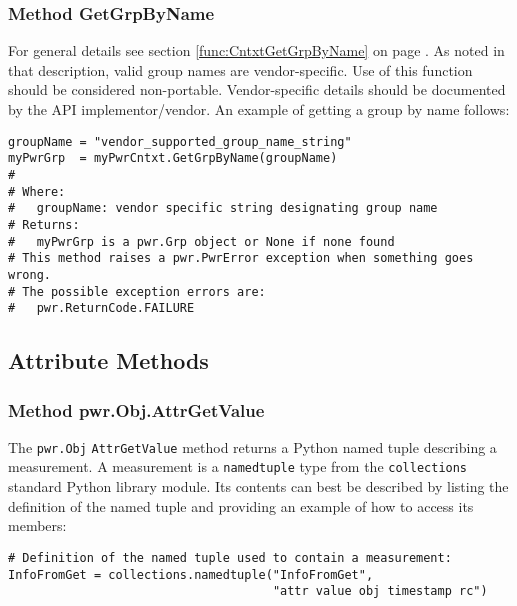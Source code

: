 \subsubsection{Method GetGrpByName} \label{meth:GetGrpByName}

For general details see section \ref{func:CntxtGetGrpByName} on page
\pageref{func:CntxtGetGrpByName}. As noted in that description, valid group
names are vendor-specific. Use of this function should be considered
non-portable. Vendor-specific details should be documented by the API
implementor/vendor. An example of getting a group by name follows:

\begin{center}\begin{minipage}{.95\linewidth}\begin{lstlisting}
groupName = "vendor_supported_group_name_string"
myPwrGrp  = myPwrCntxt.GetGrpByName(groupName)
#
# Where:
#   groupName: vendor specific string designating group name
# Returns:
#   myPwrGrp is a pwr.Grp object or None if none found
# This method raises a pwr.PwrError exception when something goes wrong.
# The possible exception errors are:
#   pwr.ReturnCode.FAILURE
\end{lstlisting}\end{minipage}\end{center}

\subsection{Attribute Methods} \label{sec:PythonAttributeMethods}

\subsubsection{Method pwr.Obj.AttrGetValue}
\label{meth:ObjAttrGetValue}

The \texttt{pwr.Obj} \texttt{AttrGetValue} method returns a Python named tuple
describing a measurement. A measurement is a \texttt{namedtuple} type from the
\texttt{collections} standard Python library module. Its
contents can best be described by listing the definition of the named tuple and
providing an example of how to access its members:

\begin{center}\begin{minipage}{.95\linewidth}\begin{lstlisting}
# Definition of the named tuple used to contain a measurement:
InfoFromGet = collections.namedtuple("InfoFromGet",
                                     "attr value obj timestamp rc")
\end{lstlisting}\end{minipage}\end{center}

